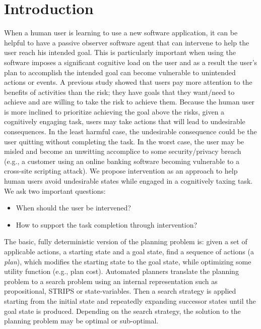 \documentclass[doctor]{thesis} %
\theoremstyle{plain}
\begin{document}
\section*{Introduction}
\label{sec:introduction}
When a human user is learning to use a new software application, it can be helpful to have a passive observer software agent that can intervene to help the user reach his intended goal. This is particularly important when using the software imposes a significant cognitive load on the user and as a result the user's plan to accomplish the intended goal can become vulnerable to unintended actions or events. A previous study \cite{byrne2016} showed that users pay more attention to the benefits of activities than the risk; they have goals that they want/need to achieve and are willing to take the risk to achieve them. Because the human user is more inclined to prioritize achieving the goal above the risks, given a cognitively engaging task, users may take actions that will lead to undesirable consequences. In the least harmful case, the undesirable consequence could be the user quitting without completing the task. In the worst case, the user may be misled and become an unwitting accomplice to some security/privacy breach (e.g., a customer using an online banking software becoming vulnerable to a cross-site scripting attack). We propose intervention as an approach to help human users avoid undesirable states while engaged in a cognitively taxing task. We ask two important questions:
\begin{itemize}
\item When should the user be intervened?
\item How to support the task completion through intervention?
\end{itemize}

The basic, fully deterministic version of the planning problem is: given a set of applicable actions, a starting state and a goal state, find a sequence of actions (a \textit{plan}), which modifies the starting state to the goal state, while optimizing some utility function (e.g., plan cost). Automated planners translate the planning problem to a search problem using an internal representation such as propositional, STRIPS or state-variables. Then a search strategy is applied starting from the initial state and repeatedly expanding successor states until the goal state is produced. Depending on the search strategy, the solution to the planning problem may be optimal or sub-optimal.
\end{document}
